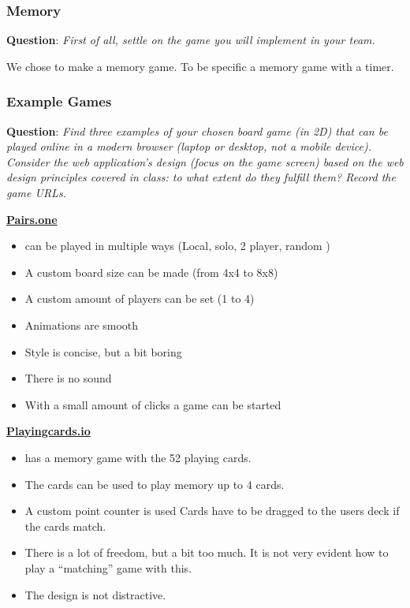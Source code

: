 \documentclass{article}
\begin{document}
\subsubsection{Memory}
\textbf{Question}: \textit{First of all, settle on the game you will implement in your team.}

We chose to make a memory game. To be specific a memory game with a timer.

\subsubsection{Example Games}
\textbf{Question}: \textit{Find three examples of your chosen board game (in 2D) that can be played online in a modern browser (laptop or desktop, not a mobile device). Consider the web application’s design (focus on the game screen) based on the web design principles covered in class: to what extent do they fulfill them? Record the game URLs.}

\href{pairs.one}{\textbf{Pairs.one}}
\begin{itemize}
    \item can be played in multiple ways (Local, solo, 2 player, random )
    \item A custom board size can be made (from 4x4 to 8x8)
    \item A custom amount of players can be set (1 to 4)
    \item Animations are smooth
    \item Style is concise, but a bit boring
    \item There is no sound
    \item With a small amount of clicks a game can be started
\end{itemize}


\href{playingcards.io}{\textbf{Playingcards.io}}
\begin{itemize}
    \item has a memory game with the 52 playing cards.
    \item The cards can be used to play memory up to 4 cards.
    \item A custom point counter is used
Cards have to be dragged to the users deck if the cards match.
    \item There is a lot of freedom, but a bit too much.
It is not very evident how to play a “matching” game with this.
    \item The design is not distractive.
\end{itemize}
\end{document}
